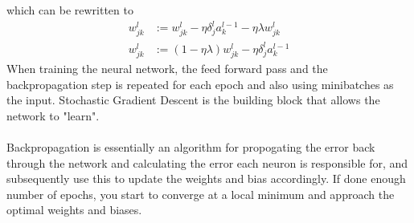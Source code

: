 \documentclass[a4paper,twocolumn]{article}
\begin{document}
which can be rewritten to
\begin{align}
    w_{jk}^{l} &:= w_{jk}^{l} - \eta \delta_{j}^{l} a_{k}^{l - 1} - \eta \lambda w_{jk}^{l}\\
    w_{jk}^{l} &:= (1 - \eta\lambda)w_{jk}^{l} - \eta \delta_{j}^{l} a_{k}^{l - 1}
\end{align}
When training the neural network, the feed forward pass and the backpropagation step is repeated for each epoch and also using minibatches as the input. Stochastic Gradient Descent is the building block that allows the network to "learn".\\
\\
Backpropagation is essentially an algorithm for propogating the error back through the network and calculating the error each neuron is responsible for, and subsequently use this to update the weights and bias accordingly. If done enough number of epochs, you start to converge at a local minimum and approach the optimal weights and biases.
\end{document}
